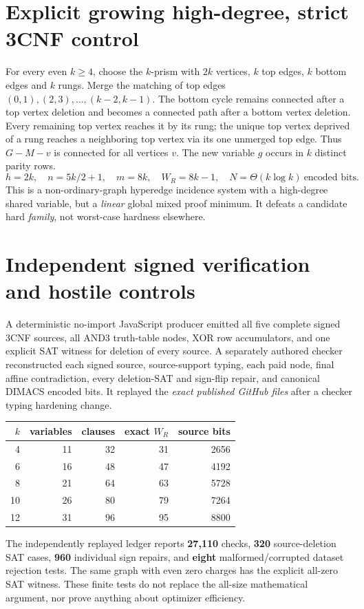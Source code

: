\documentclass[11pt]{article}
\begin{document}
\section*{Explicit growing high-degree, strict 3CNF control}
For every even \(k\ge4\), choose the \(k\)-prism with \(2k\) vertices, \(k\) top edges, \(k\) bottom edges and \(k\) rungs. Merge the matching of top edges \((0,1),(2,3),\ldots,(k-2,k-1)\). The bottom cycle remains connected after a top vertex deletion and becomes a connected path after a bottom vertex deletion. Every remaining top vertex reaches it by its rung; the unique top vertex deprived of a rung reaches a neighboring top vertex via its one unmerged top edge. Thus \(G-M-v\) is connected for all vertices \(v\). The new variable \(g\) occurs in \(k\) distinct parity rows.
\[
 h=2k,\quad n=5k/2+1,\quad m=8k,\quad W_R=8k-1,
 \quad N=\Theta(k\log k)\ \text{encoded bits}.
\]
This is a non-ordinary-graph hyperedge incidence system with a high-degree shared variable, but a \emph{linear} global mixed proof minimum. It defeats a candidate hard \emph{family}, not worst-case hardness elsewhere.

\section*{Independent signed verification and hostile controls}
A deterministic no-import JavaScript producer emitted all five complete signed 3CNF sources, all AND3 truth-table nodes, XOR row accumulators, and one explicit SAT witness for deletion of every source. A separately authored checker reconstructed each signed source, source-support typing, each paid node, final affine contradiction, every deletion-SAT and sign-flip repair, and canonical DIMACS encoded bits. It replayed the \emph{exact published GitHub files} after a checker typing hardening change.
\begin{center}\begin{tabular}{rrrrr}\toprule
\(k\)&variables&clauses&exact \(W_R\)&source bits\\\midrule
4&11&32&31&2656\\6&16&48&47&4192\\
8&21&64&63&5728\\10&26&80&79&7264\\
12&31&96&95&8800\\\bottomrule\end{tabular}\end{center}
The independently replayed ledger reports \textbf{27,110} checks, \textbf{320} source-deletion SAT cases, \textbf{960} individual sign repairs, and \textbf{eight} malformed/corrupted dataset rejection tests. The same graph with even zero charges has the explicit all-zero SAT witness. These finite tests do not replace the all-size mathematical argument, nor prove anything about optimizer efficiency.
\end{document}
